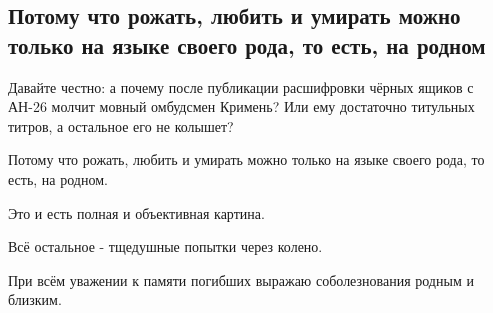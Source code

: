  
 
 
 
 
\subsection{Потому что рожать, любить и умирать можно только на языке своего рода, то есть, на родном}
\label{sec:17_05_2021.fb.skidan_elena.1.an26_chuguev_katastrofa_jazyk_mova}

Давайте честно: а почему после публикации расшифровки чёрных ящиков с АН-26
молчит мовный омбудсмен Кримень? Или ему достаточно титульных титров, а
остальное его не колышет? 

Потому что рожать, любить и умирать можно только на языке своего рода, то есть,
на родном. 

Это и есть полная и объективная картина.

Всё остальное - тщедушные попытки через колено.

При всём уважении к памяти погибших выражаю соболезнования родным и близким.
